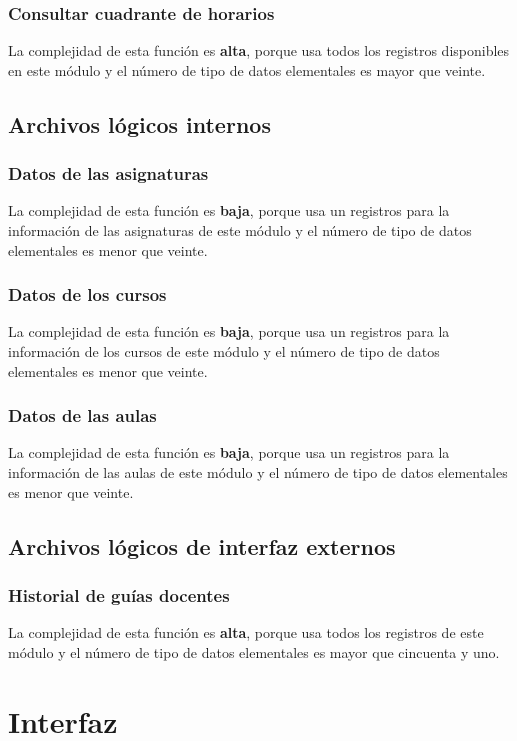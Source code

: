 \documentclass[11pt,a4paper,spanish,twoside]{book}
\begin{document}
\subsubsection{Consultar cuadrante de horarios}
La complejidad de esta función es \textbf{alta}, porque usa todos los
registros disponibles en este módulo y el número de tipo de datos elementales
es mayor que veinte.

\subsection{Archivos lógicos internos}
\subsubsection{Datos de las asignaturas}
La complejidad de esta función es \textbf{baja}, porque usa un
registros para la información de las asignaturas de este módulo y el número
de tipo de datos elementales es menor que veinte.

\subsubsection{Datos de los cursos}
La complejidad de esta función es \textbf{baja}, porque usa un
registros para la información de los cursos de este módulo y el número
de tipo de datos elementales es menor que veinte.

\subsubsection{Datos de las aulas}
La complejidad de esta función es \textbf{baja}, porque usa un
registros para la información de las aulas de este módulo y el número
de tipo de datos elementales es menor que veinte.

\subsection{Archivos lógicos de interfaz externos}
\subsubsection{Historial de guías docentes}
La complejidad de esta función es \textbf{alta}, porque usa todos los
registros de este módulo y el número de tipo de datos elementales es mayor
que cincuenta y uno. 


\section{Interfaz}
\end{document}
